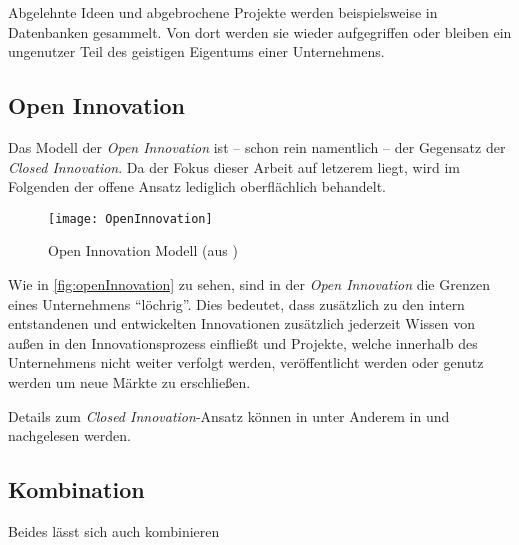 Abgelehnte Ideen und abgebrochene Projekte werden beispielsweise in Datenbanken gesammelt.
Von dort werden sie wieder aufgegriffen oder bleiben ein ungenutzer Teil des geistigen Eigentums einer Unternehmens.


\subsection{Open Innovation}\label{sec:grundlagen-open}

Das Modell der \textit{Open Innovation} ist -- schon rein namentlich -- der Gegensatz der \textit{Closed Innovation}.
Da der Fokus dieser Arbeit auf letzerem liegt,
wird im Folgenden der offene Ansatz lediglich oberflächlich behandelt.

\begin{figure}[ht!]
    \centering
    \texttt{[image: OpenInnovation]}
    \caption{Open Innovation Modell (aus \cite[23]{herzog2011})}
    \label{fig:openInnovation}
\end{figure}

Wie in \autoref{fig:openInnovation} zu sehen,
sind in der \textit{Open Innovation} die Grenzen eines Unternehmens \enquote{löchrig}.
Dies bedeutet, dass zusätzlich zu den intern entstandenen und entwickelten Innovationen
zusätzlich jederzeit Wissen von außen in den Innovationsprozess einfließt
und Projekte, welche innerhalb des Unternehmens nicht weiter verfolgt werden,
veröffentlicht werden oder genutz werden um neue Märkte zu erschließen.

Details zum \textit{Closed Innovation}-Ansatz können in unter Anderem
in \cite[60\psqq]{chesbrough2003} und \cite[21\psqq]{herzog2011} nachgelesen werden.


\subsection{Kombination}\label{sec:grundlagen-kombi}

Beides lässt sich auch kombinieren